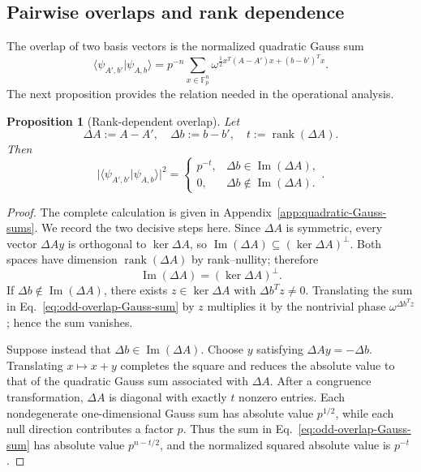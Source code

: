 \documentclass[11pt]{article}
\newcommand{\F}{\mathbb F}
\newcommand{\rank}{\operatorname{rank}}
\newcommand{\im}{\operatorname{Im}}
\newcommand{\1}{\mathbf 1}
\theoremstyle{plain}
\newtheorem{proposition}[theorem]{Proposition}
\theoremstyle{definition}
\theoremstyle{remark}
\begin{document}
\subsection{Pairwise overlaps and rank dependence}
\label{subsec:odd-overlaps}

The overlap of two basis vectors is the normalized quadratic Gauss sum
\begin{equation}
  \langle\psi_{A',b'}|\psi_{A,b}\rangle
  =p^{-n}\sum_{x\in\F_p^n}
   \omega^{\frac12x^T(A-A')x+(b-b')^Tx}.
  \label{eq:odd-overlap-Gauss-sum}
\end{equation}
The next proposition provides the relation needed in the operational analysis.

\begin{proposition}[Rank-dependent overlap]
\label{prop:rank-dependent-overlap}
Let
\begin{equation}
  \Delta A:=A-A',
  \quad
  \Delta b:=b-b',
  \quad
  t:=\rank(\Delta A).
  \label{eq:overlap-differences}
\end{equation}
Then
\begin{equation}
  \lvert\langle\psi_{A',b'}|\psi_{A,b}\rangle\rvert^2
  =
  \begin{cases}
    p^{-t},&\Delta b\in\im(\Delta A),\\
    0,&\Delta b\notin\im(\Delta A).
  \end{cases}.
  \label{eq:rank-dependent-overlap}
\end{equation}
\end{proposition}

\begin{proof}
The complete calculation is given in Appendix~\ref{app:quadratic-Gauss-sums}. We record the two decisive steps here.  Since $\Delta A$ is symmetric, every vector $\Delta Ay$ is orthogonal
to $\ker\Delta A$, so
$\im(\Delta A)\subseteq(\ker\Delta A)^\perp$.  Both spaces have
dimension $\rank(\Delta A)$ by rank--nullity; therefore
\begin{equation}
  \im(\Delta A)=(\ker\Delta A)^\perp.
  \label{eq:image-kernel-orthogonal}
\end{equation}
If $\Delta b\notin\im(\Delta A)$, there exists
$z\in\ker\Delta A$ with $\Delta b^Tz\ne0$.  Translating the sum in
Eq.~\eqref{eq:odd-overlap-Gauss-sum} by $z$ multiplies it by the nontrivial
phase $\omega^{\Delta b^Tz}$; hence the sum vanishes.

Suppose instead that $\Delta b\in\im(\Delta A)$.  Choose $y$ satisfying
$\Delta Ay=-\Delta b$.  Translating $x\mapsto x+y$ completes the square and
reduces the absolute value to that of the quadratic Gauss sum associated with
$\Delta A$.  After a congruence transformation, $\Delta A$ is diagonal with
exactly $t$ nonzero entries.  Each nondegenerate one-dimensional Gauss sum has
absolute value $p^{1/2}$, while each null direction contributes a factor $p$.
Thus the sum in Eq.~\eqref{eq:odd-overlap-Gauss-sum} has absolute value
$p^{n-t/2}$, and the normalized squared absolute value is $p^{-t}$.
\end{proof}
\end{document}
